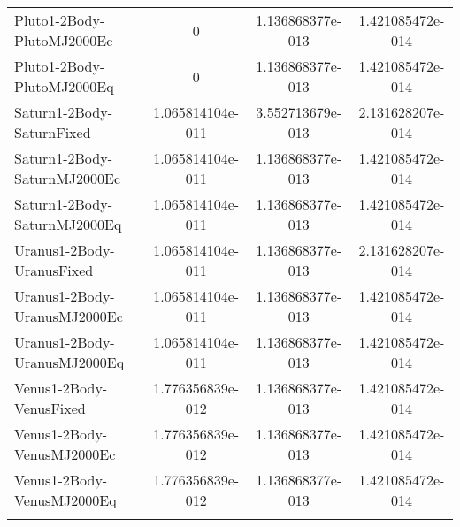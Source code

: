 \begin{table}[htbp!]
\begin{tabular}{lccc}
         Pluto1-2Body-PlutoMJ2000Ec & 0 & 1.136868377e-013 & 1.421085472e-014 \\
         Pluto1-2Body-PlutoMJ2000Eq & 0 & 1.136868377e-013 & 1.421085472e-014 \\
         Saturn1-2Body-SaturnFixed & 1.065814104e-011 & 3.552713679e-013 & 2.131628207e-014 \\
         Saturn1-2Body-SaturnMJ2000Ec & 1.065814104e-011 & 1.136868377e-013 & 1.421085472e-014 \\
         Saturn1-2Body-SaturnMJ2000Eq & 1.065814104e-011 & 1.136868377e-013 & 1.421085472e-014 \\
         Uranus1-2Body-UranusFixed & 1.065814104e-011 & 1.136868377e-013 & 2.131628207e-014 \\
         Uranus1-2Body-UranusMJ2000Ec & 1.065814104e-011 & 1.136868377e-013 & 1.421085472e-014 \\
         Uranus1-2Body-UranusMJ2000Eq & 1.065814104e-011 & 1.136868377e-013 & 1.421085472e-014 \\
         Venus1-2Body-VenusFixed & 1.776356839e-012 & 1.136868377e-013 & 1.421085472e-014 \\
         Venus1-2Body-VenusMJ2000Ec & 1.776356839e-012 & 1.136868377e-013 & 1.421085472e-014 \\
         Venus1-2Body-VenusMJ2000Eq & 1.776356839e-012 & 1.136868377e-013 & 1.421085472e-014 \\
      \hline\hline
      \label{Table: WinGMAT-LinuxGMAT CS Parameters Set 4} 
\end{tabular}
\end{table}

